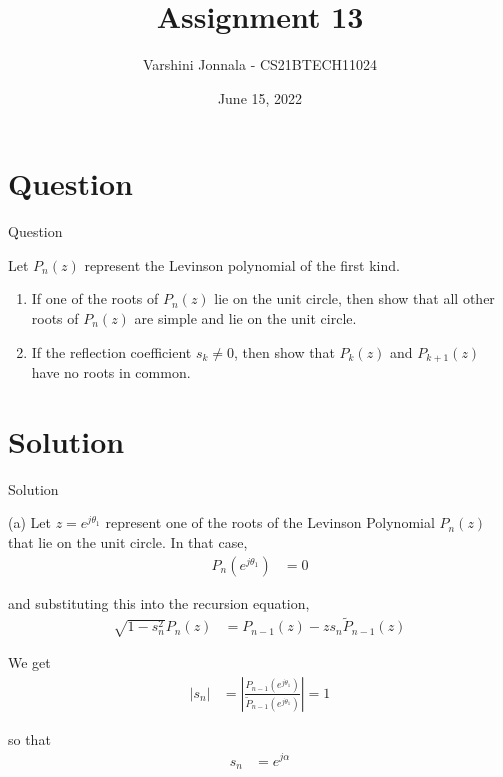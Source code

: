 \documentclass{beamer}
\title{Assignment 13}
\author{Varshini Jonnala - CS21BTECH11024}
\date{June 15, 2022}
\providecommand{\abs}[1]{\left\vert#1\right\vert}
\providecommand{\brak}[1]{\ensuremath{\left(#1\right)}}
\begin{document}
\begin{frame}
    \titlepage 
\end{frame}

\section{Question}
\begin{frame}{Question}

    Let $P_n(z)$ represent the Levinson polynomial of the first kind. 
    \begin{enumerate}[label=(\alph*)]
        \item If one of the roots of $P_n(z)$ lie on the unit circle, then show that all other roots of $P_n(z)$ are simple and lie on the unit circle.
        \item If the reflection coefficient $s_k\neq0$, then show that $P_k(z)$ and $P_{k+1}(z)$ have no roots in common. 
    \end{enumerate}
\end{frame}

\section{Solution}
\begin{frame}{Solution}

    (a) Let $z=e^{j\theta_1}$ represent one of the roots of the Levinson Polynomial $P_n(z)$ that lie on the unit circle. In that case,
    \begin{align}
        P_n\brak{e^{j\theta_1}} &= 0
    \end{align}
    
    and substituting this into the recursion equation, 
    \begin{align}
        \sqrt{1-s_n^2}P_n(z) &= P_{n-1}(z)-z s_n\tilde{P}_{n-1}(z)
    \end{align}
    
    We get
    \begin{align}
        \abs{s_n} &= \abs{\frac{P_{n-1}\brak{e^{j\theta_1}}}{\tilde{P}_{n-1}\brak{e^{j\theta_1}}}}=1
    \end{align}
    
    so that
    \begin{align}
        s_n &= e^{j\alpha}
    \end{align}
\end{frame} 
\end{document}
